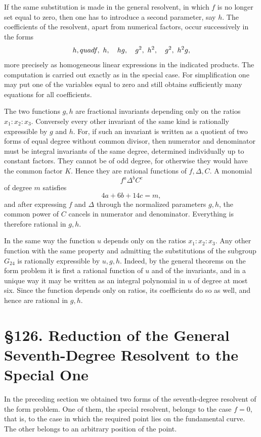 \documentclass[11pt,a4paper]{book}
\newcommand{\webersection}[2]{\clearpage\section*{\S #1. #2}}
\begin{document}
If the same substitution is made in the general resolvent, in which \(f\) is no longer set equal to zero, then one has to introduce a second parameter, say \(h\).  The coefficients of the resolvent, apart from numerical factors, occur successively in the forms
\[
 h,\\quad f,\ h,\quad hg,\quad g^2,\ h^2,\quad g^2,\ h^2g,
\]
more precisely as homogeneous linear expressions in the indicated products.  The computation is carried out exactly as in the special case.  For simplification one may put one of the variables equal to zero and still obtains sufficiently many equations for all coefficients.

The two functions \(g,h\) are fractional invariants depending only on the ratios \(x_1:x_2:x_3\).  Conversely every other invariant of the same kind is rationally expressible by \(g\) and \(h\).  For, if such an invariant is written as a quotient of two forms of equal degree without common divisor, then numerator and denominator must be integral invariants of the same degree, determined individually up to constant factors.  They cannot be of odd degree, for otherwise they would have the common factor \(K\).  Hence they are rational functions of \(f,\Delta,C\).  A monomial
\[
 f^a\Delta^bC^c
\]
of degree \(m\) satisfies
\[
 4a+6b+14c=m,
\]
and after expressing \(f\) and \(\Delta\) through the normalized parameters \(g,h\), the common power of \(C\) cancels in numerator and denominator.  Everything is therefore rational in \(g,h\).

In the same way the function \(u\) depends only on the ratios \(x_1:x_2:x_3\).  Any other function with the same property and admitting the substitutions of the subgroup \(G_{24}\) is rationally expressible by \(u,g,h\).  Indeed, by the general theorems on the form problem it is first a rational function of \(u\) and of the invariants, and in a unique way it may be written as an integral polynomial in \(u\) of degree at most six.  Since the function depends only on ratios, its coefficients do so as well, and hence are rational in \(g,h\).

\webersection{126}{Reduction of the General Seventh-Degree Resolvent to the Special One}

In the preceding section we obtained two forms of the seventh-degree resolvent of the form problem.  One of them, the special resolvent, belongs to the case \(f=0\), that is, to the case in which the required point lies on the fundamental curve.  The other belongs to an arbitrary position of the point.
\end{document}
